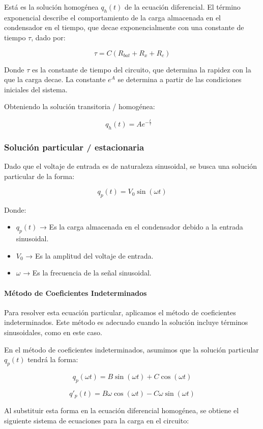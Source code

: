 Está es la solución homogénea \(q_h(t)\) de la ecuación diferencial. El término exponencial
describe el comportamiento de la carga almacenada en el condensador en
el tiempo, que decae exponencialmente con una constante de tiempo \(\tau\), dado por:

\[
    \tau = C(R_{bat} + R_x + R_c)
\]

Donde \(\tau\) es la constante de tiempo del circuito, que determina la rapidez con la que la
carga decae. La constante \(e^A\) se determina a partir de las condiciones iniciales del
sistema.

Obteniendo la solución transitoria / homogénea:

\[
    q_h(t) = A e^{-\frac{t}{\tau}} \quad
\]

\subsubsection*{Solución particular / estacionaria}
Dado que el voltaje de entrada es de naturaleza sinusoidal, se busca una solución particular de
la forma:

\[
    q_p(t) = V_0\sin(\omega t)
\]

Donde:
\begin{itemize}
    \item \(q_p(t)\) → Es la carga almacenada en el condensador debido a la entrada sinusoidal.
    \item \(V_0\) → Es la amplitud del voltaje de entrada.
    \item \(\omega\) → Es la frecuencia de la señal sinusoidal.
\end{itemize}

\paragraph*{Método de Coeficientes Indeterminados}
Para resolver esta ecuación particular, aplicamos el método de coeficientes indeterminados.
Este método es adecuado cuando la solución incluye términos sinusoidales, como en este
caso.

En el método de coeficientes indeterminados, asumimos que la solución particular \( q_p(t) \)
tendrá la forma:

\[
    q_p(\omega t) = B \sin(\omega t) + C \cos(\omega t)
\]

\[
    q'_p(t) = B\omega \cos(\omega t) - C\omega \sin(\omega t)
\]

Al substituir esta forma en la ecuación diferencial homogénea, se obtiene el siguiente sistema
de ecuaciones para la carga en el circuito:

